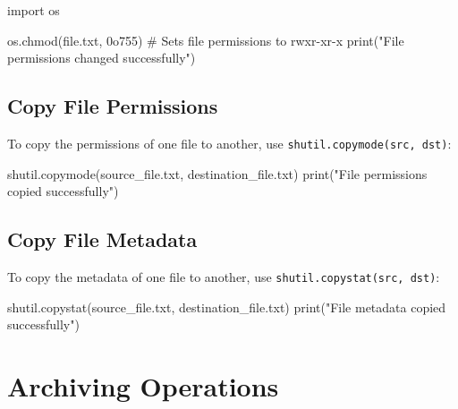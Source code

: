 \documentclass[
  letterpaper,
  DIV=11,
  numbers=noendperiod]{scrreprt}
\newenvironment{Shaded}{\begin{snugshade}}{\end{snugshade}}
\newcommand{\BaseNTok}[1]{\textcolor[rgb]{0.68,0.00,0.00}{#1}}
\newcommand{\BuiltInTok}[1]{\textcolor[rgb]{0.00,0.23,0.31}{#1}}
\newcommand{\CommentTok}[1]{\textcolor[rgb]{0.37,0.37,0.37}{#1}}
\newcommand{\ImportTok}[1]{\textcolor[rgb]{0.00,0.46,0.62}{#1}}
\newcommand{\NormalTok}[1]{\textcolor[rgb]{0.00,0.23,0.31}{#1}}
\newcommand{\StringTok}[1]{\textcolor[rgb]{0.13,0.47,0.30}{#1}}
\begin{document}
\begin{Shaded}
\begin{Highlighting}[]
\ImportTok{import}\NormalTok{ os}

\NormalTok{os.chmod(}\StringTok{\textquotesingle{}file.txt\textquotesingle{}}\NormalTok{, }\BaseNTok{0o755}\NormalTok{)  }\CommentTok{\# Sets file permissions to rwxr{-}xr{-}x}
\BuiltInTok{print}\NormalTok{(}\StringTok{"File permissions changed successfully"}\NormalTok{)}
\end{Highlighting}
\end{Shaded}

\subsection{Copy File Permissions}\label{copy-file-permissions}

To copy the permissions of one file to another, use
\texttt{shutil.copymode(src,\ dst)}:

\begin{Shaded}
\begin{Highlighting}[]
\NormalTok{shutil.copymode(}\StringTok{\textquotesingle{}source\_file.txt\textquotesingle{}}\NormalTok{, }\StringTok{\textquotesingle{}destination\_file.txt\textquotesingle{}}\NormalTok{)}
\BuiltInTok{print}\NormalTok{(}\StringTok{"File permissions copied successfully"}\NormalTok{)}
\end{Highlighting}
\end{Shaded}

\subsection{Copy File Metadata}\label{copy-file-metadata}

To copy the metadata of one file to another, use
\texttt{shutil.copystat(src,\ dst)}:

\begin{Shaded}
\begin{Highlighting}[]
\NormalTok{shutil.copystat(}\StringTok{\textquotesingle{}source\_file.txt\textquotesingle{}}\NormalTok{, }\StringTok{\textquotesingle{}destination\_file.txt\textquotesingle{}}\NormalTok{)}
\BuiltInTok{print}\NormalTok{(}\StringTok{"File metadata copied successfully"}\NormalTok{)}
\end{Highlighting}
\end{Shaded}

\section{Archiving Operations}\label{archiving-operations}
\end{document}
